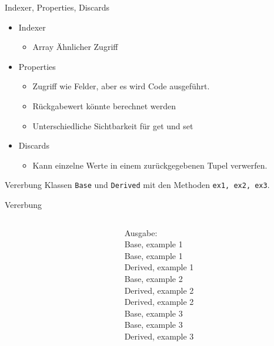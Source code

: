 \documentclass[11pt]{beamer}
\begin{document}
\begin{frame}{Indexer, Properties, Discards}
	\begin{itemize}
		\item Indexer
		\begin{itemize}
			\item Array Ähnlicher Zugriff
		\end{itemize}
		\item Properties 
		\begin{itemize}
			\item Zugriff wie Felder, aber es wird Code ausgeführt. 
			\item Rückgabewert könnte berechnet werden
			\item Unterschiedliche Sichtbarkeit für \glqq get\grqq{} und \glqq set\grqq
		\end{itemize}
		\item Discards 
		\begin{itemize}
			\item Kann einzelne Werte in einem zurückgegebenen Tupel verwerfen.
		\end{itemize}
	\end{itemize}
\end{frame}

\begin{frame}{Vererbung}
	Klassen \texttt{Base} und \texttt{Derived} mit den Methoden \texttt{ex1, ex2, ex3}.
\end{frame}

\begin{frame}{Vererbung}
	\begin{columns}
		\begin{column}{0.7\textwidth}
		\end{column}
		\begin{column}{0.3\textwidth}
		Ausgabe: \\
Base, example 1\\
Base, example 1\\
Derived, example 1\\
Base, example 2\\
Derived, example 2\\
Derived, example 2\\
Base, example 3\\
Base, example 3\\
Derived, example 3
			
		\end{column}
	

	\end{columns}


\end{frame}
\end{document}
